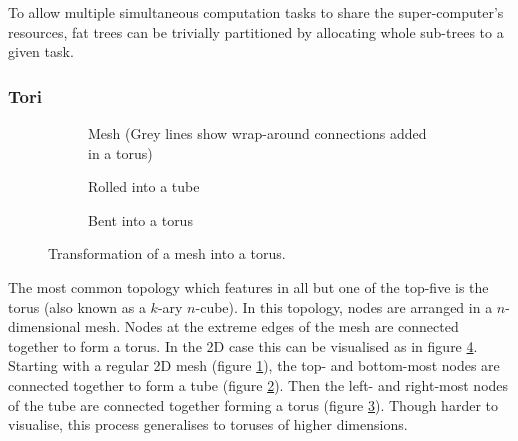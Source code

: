 				To allow multiple simultaneous computation tasks to share the
				super-computer's resources, fat trees can be trivially partitioned by
				allocating whole sub-trees to a given task.
			
			\subsubsection{Tori}
				
				\begin{figure}
					\begin{subfigure}[t]{\textwidth}
						\center
						
						\caption{Mesh (Grey lines show wrap-around connections added in a
						torus)}
						\label{fig:torus-flat}
					\end{subfigure}
					
					\vspace{1em}
					
					\begin{subfigure}[t]{\textwidth}
						\center
						
						\caption{Rolled into a tube}
						\label{fig:torus-pipe}
					\end{subfigure}
					
					\vspace{1em}
					
					\begin{subfigure}[t]{\textwidth}
						\center
						
						\caption{Bent into a torus}
						\label{fig:torus-3D}
					\end{subfigure}
					
					\caption{Transformation of a mesh into a torus.}
					\label{fig:forming-a-torus}
				\end{figure}
			
				The most common topology which features in all but one of the top-five
				is the torus (also known as a $k$-ary $n$-cube). In this topology, nodes
				are arranged in a $n$-dimensional mesh. Nodes at the extreme edges of
				the mesh are connected together to form a torus. In the 2D case this can
				be visualised as in figure \ref{fig:forming-a-torus}. Starting with a
				regular 2D mesh (figure \ref{fig:torus-flat}), the top- and bottom-most
				nodes are connected together to form a tube (figure
				\ref{fig:torus-pipe}).  Then the left- and right-most nodes of the tube
				are connected together forming a torus (figure \ref{fig:torus-3D}).
				Though harder to visualise, this process generalises to toruses of
				higher dimensions.
				
